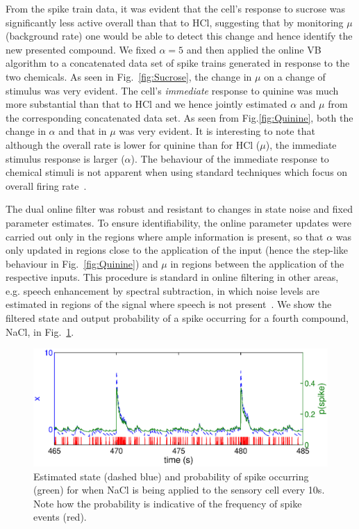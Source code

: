 \documentclass[12pt]{article}
\begin{document}
From the spike train data, it was evident that the cell's response to sucrose was significantly less active overall than that to HCl, suggesting that by monitoring $\mu$ (background rate) one would be able to detect this change and hence identify the new presented compound. We fixed $\alpha = 5$ and then applied the online VB algorithm to a concatenated data set of spike trains generated in response to the two chemicals. As seen in Fig.~\ref{fig:Sucrose}, the change in $\mu$ on a change of stimulus was very evident. The cell's \emph{immediate} response to quinine was much more substantial than that to HCl and we hence jointly estimated $\alpha$ and $\mu$ from the corresponding concatenated data set. As seen from Fig.\ref{fig:Quinine}, both the change in $\alpha$ and that in $\mu$ was very evident. It is interesting to note that although the overall rate is lower for quinine than for HCl ($\mu$), the immediate stimulus response is larger ($\alpha$). The  behaviour of the immediate response to chemical stimuli is not apparent when using standard techniques which focus on overall firing rate~\cite{Lorenzo_2003}.

The dual online filter was robust and resistant to changes in state noise and fixed parameter
estimates. To ensure identifiability, the online parameter updates were carried out only in the
regions where ample information is present, so that $\alpha$ was only updated in regions close to
the application of the input (hence the step-like behaviour in Fig.~\ref{fig:Quinine}) and $\mu$ in regions between the
application of the respective inputs. This procedure is standard in online filtering in other areas,
e.g.  speech enhancement by spectral subtraction, in which noise levels are estimated in regions of the
signal where speech is not present~\cite{Boll_1979}. We show the filtered state and output probability of a spike occurring for a fourth compound, NaCl, in Fig.~\ref{fig:onlinestate}.

\begin{figure}[h] \begin{center}
 \includegraphics[width = 5in]{./Figures/taste_state.eps}  \caption{Estimated state (dashed blue) and
 probability of spike occurring (green) for when NaCl is being applied to the sensory cell every
 10s. Note how the probability is indicative of the frequency of spike events (red).}
 \label{fig:onlinestate} \end{center}

\end{figure}
\end{document}
